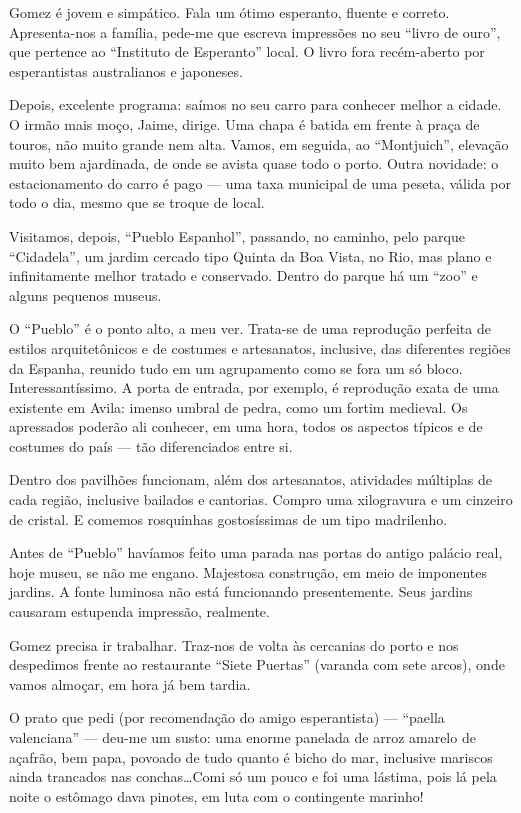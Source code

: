 Gomez é jovem e simpático. Fala um ótimo esperanto, fluente e correto. Apresenta-nos a família, pede-me que escreva impressões no seu ``livro de ouro'', que pertence ao ``Instituto de Esperanto'' local. O livro fora recém-aberto por esperantistas australianos e japoneses.

Depois, excelente programa: saímos no seu carro para conhecer melhor a cidade. O irmão mais moço, Jaime, dirige. Uma chapa é batida em frente à praça de touros, não muito grande nem alta. Vamos, em seguida, ao ``Montjuich'', elevação muito bem ajardinada, de onde se avista quase todo o porto. Outra novidade: o estacionamento do carro é pago --- uma taxa municipal de uma peseta, válida por todo o dia, mesmo que se troque de local.

Visitamos, depois, ``Pueblo Espanhol'', passando, no caminho, pelo parque ``Cidadela'', um jardim cercado tipo Quinta da Boa Vista, no Rio, mas plano e infinitamente melhor tratado e conservado. Dentro do parque há um ``zoo'' e alguns pequenos museus.

O ``Pueblo'' é o ponto alto, a meu ver. Trata-se de uma reprodução perfeita de estilos arquitetônicos e de costumes e artesanatos, inclusive, das diferentes regiões da Espanha, reunido tudo em um agrupamento como se fora um só bloco. Interessantíssimo. A porta de entrada, por exemplo, é reprodução exata de uma existente em Avila: imenso umbral de pedra, como um fortim medieval. Os apressados poderão ali conhecer, em uma hora, todos os aspectos típicos e de costumes do país --- tão diferenciados entre si.

Dentro dos pavilhões funcionam, além dos artesanatos, atividades múltiplas de cada região, inclusive bailados e cantorias. Compro uma xilogravura e um cinzeiro de cristal. E comemos rosquinhas gostosíssimas de um tipo madrilenho.

Antes de ``Pueblo'' havíamos feito uma parada nas portas do antigo palácio real, hoje museu, se não me engano. Majestosa construção, em meio de imponentes jardins. A fonte luminosa não está funcionando presentemente. Seus jardins causaram estupenda impressão, realmente.

Gomez precisa ir trabalhar. Traz-nos de volta às cercanias do porto e nos despedimos frente ao restaurante ``Siete Puertas'' (varanda com sete arcos), onde vamos almoçar, em hora já bem tardia.

O prato que pedi (por recomendação do amigo esperantista) --- ``paella valenciana'' --- deu-me um susto: uma enorme panelada de arroz amarelo de açafrão, bem papa, povoado de tudo quanto é bicho do mar, inclusive mariscos ainda trancados nas conchas\ldots Comi só um pouco e foi uma lástima, pois lá pela noite o estômago dava pinotes, em luta com o contingente marinho!

